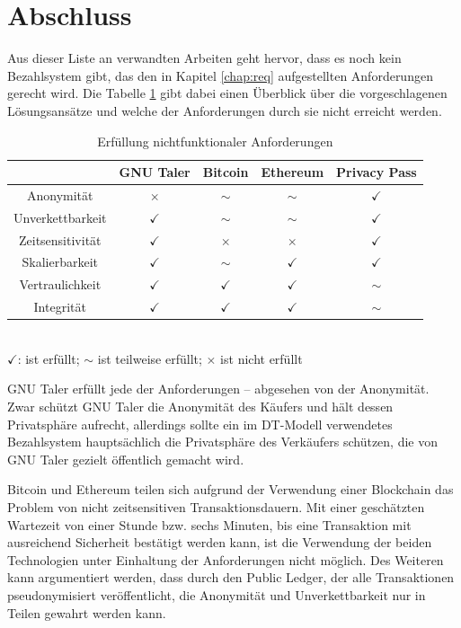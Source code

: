 \documentclass[
	fontsize=11pt,
	headings=small,
	parskip=half,           %
	bibliography=totoc,
	numbers=noenddot,       %
	open=any,               %
]{scrreprt}
\begin{document}
\section{Abschluss}
Aus dieser Liste an verwandten Arbeiten geht hervor, dass es noch kein Bezahlsystem gibt, das den in Kapitel \ref{chap:req} aufgestellten Anforderungen gerecht wird. Die Tabelle \ref{tab:nichtfunktionale_Anforderungen} gibt dabei einen Überblick über die vorgeschlagenen Lösungsansätze und welche der Anforderungen durch sie nicht erreicht werden.
\begin{table}[H]
    \centering
    \begin{tabular}{|c|c|c|c|c|}
        \hline
        & GNU Taler & Bitcoin & Ethereum & Privacy Pass \\
        \hline
        Anonymität & $\times$  & $\mathtt{\sim}$ & $\mathtt{\sim}$ & $\checkmark$ \\
        \hline
        Unverkettbarkeit & $\checkmark$  & $\mathtt{\sim}$ & $\mathtt{\sim}$ & $\checkmark$ \\
        \hline
        Zeitsensitivität & $\checkmark$ & $\times$ & $\times$ & $\checkmark$ \\
        \hline
        Skalierbarkeit & $\checkmark$ & $\mathtt{\sim}$ & $\checkmark$  & $\checkmark$\\
        \hline
        Vertraulichkeit & $\checkmark$ & $\checkmark$ & $\checkmark$ & $\mathtt{\sim}$ \\
        \hline
        Integrität & $\checkmark$ & $\checkmark$ & $\checkmark$ & $\mathtt{\sim}$ \\
        \hline
    \end{tabular}\\
    \vspace{5pt}
    $\checkmark$: ist erfüllt; $\mathtt{\sim}$ ist teilweise erfüllt; $\times$ ist nicht erfüllt
    \caption{Erfüllung nichtfunktionaler Anforderungen}
    \label{tab:nichtfunktionale_Anforderungen}
\end{table}
GNU Taler erfüllt jede der Anforderungen -- abgesehen von der Anonymität. Zwar schützt GNU Taler die Anonymität des Käufers und hält dessen Privatsphäre aufrecht, allerdings sollte ein im DT-Modell verwendetes Bezahlsystem hauptsächlich die Privatsphäre des Verkäufers schützen, die von GNU Taler gezielt öffentlich gemacht wird.

Bitcoin und Ethereum teilen sich aufgrund der Verwendung einer Blockchain das Problem von nicht zeitsensitiven Transaktionsdauern. Mit einer geschätzten Wartezeit von einer Stunde bzw. sechs Minuten, bis eine Transaktion mit ausreichend Sicherheit bestätigt werden kann, ist die Verwendung der beiden Technologien unter Einhaltung der Anforderungen nicht möglich. Des Weiteren kann argumentiert werden, dass durch den Public Ledger, der alle Transaktionen pseudonymisiert veröffentlicht, die Anonymität und Unverkettbarkeit nur in Teilen gewahrt werden kann. 
\end{document}
